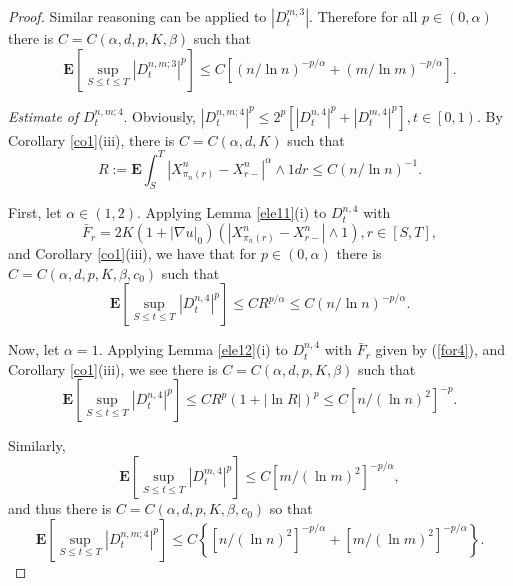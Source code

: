 \documentclass[11pt]{amsart}
\theoremstyle{plain}
\numberwithin{equation}{section}
\begin{document}
\begin{proof}
Similar reasoning can be applied to $\left\vert D_{t}^{m,3}\right\vert $.
Therefore for all $p\in \left( 0,\alpha \right) $ there is $C=C\left(
\alpha,d ,p,K,\beta\right) $ such that 
\begin{equation*}
\mathbf{E}\left[ \sup_{S\leq t\leq T}\left\vert D_{t}^{n,m;3}\right\vert ^{p}\right] \leq C\left[ \left( n/\ln n\right) ^{-p/\alpha }+\left( m/\ln
m\right) ^{-p/\alpha }\right] .
\end{equation*}

\emph{Estimate of }$D_{t}^{n,m;4}$. Obviously, $\left\vert
D_{t}^{n,m;4}\right\vert ^{p}\leq 2^{p}[\left\vert D_{t}^{n,4}\right\vert
^{p}+\left\vert D_{t}^{m,4}\right\vert ^{p}],t\in \left[ 0,1\right) $. By
Corollary \ref{co1}(iii), there is $C=C\left( \alpha,d ,K\right) $ such that\begin{equation*}
R:=\mathbf{E}\int_{S}^{T}\left\vert X_{\pi _{n}\left( r\right)
}^{n}-X_{r-}^{n}\right\vert ^{\alpha }\wedge 1dr\leq C\left( n/\ln n\right)
^{-1}.
\end{equation*}

First, let $\alpha \in \left( 1,2\right) $. Applying Lemma \ref{ele11}(i) to 
$D_{t}^{n,4}$ with 
\begin{equation}
\bar{F}_{r}=2K\left( 1+|\nabla u|_{0}\right) \left( \left\vert X_{\pi
_{n}\left( r\right) }^{n}-X_{r-}^{n}\right\vert \wedge 1\right) ,r\in \left[
S,T\right] ,  \label{for4}
\end{equation}and Corollary \ref{co1}(iii), we have that for $p\in \left( 0,\alpha \right) 
$ there is $C=C\left( \alpha ,d,p,K,\beta ,c_{0}\right) $ such that 
\begin{equation*}
\mathbf{E}\left[ \sup_{S\leq t\leq T}\left\vert D_{t}^{n,4}\right\vert ^{p}\right] \leq CR^{p/\alpha }\leq C\left( n/\ln n\right) ^{-p/\alpha }.
\end{equation*}

Now, let $\alpha =1$. Applying Lemma \ref{ele12}(i) to $D_t^{n,4}$ with $\bar{ F}_{r}$ given by (\ref{for4}), and Corollary \ref{co1}(iii), we see
there is $C=C\left(\alpha,d, p,K,\beta\right) $ such that\begin{equation*}
\mathbf{E}\left[ \sup_{S\leq t\leq T}\left\vert D_{t}^{n,4}\right\vert ^{p}\right] \leq CR^{p}\left( 1+\left\vert\ln R\right\vert\right) ^{p}\leq C\left[ n/\left( \ln n\right) ^{2}\right] ^{-p}.
\end{equation*}

Similarly, 
\begin{equation*}
\mathbf{E}\left[ \sup_{S\leq t\leq T}\left\vert D_{t}^{m,4}\right\vert ^{p}\right] \leq C\left[ m/\left( \ln m\right) ^{2}\right] ^{-p/\alpha },
\end{equation*}and thus there is $C=C\left( \alpha ,d,p,K,\beta ,c_{0}\right) $ so that\begin{equation*}
\mathbf{E}\left[ \sup_{S\leq t\leq T}\left\vert D_{t}^{n,m;4}\right\vert ^{p}\right] \leq C\left\{ \left[ n/\left( \ln n\right) ^{2}\right] ^{-p/\alpha }+\left[ m/\left( \ln m\right) ^{2}\right] ^{-p/\alpha }\right\} .
\end{equation*}


\end{proof}
\end{document}
